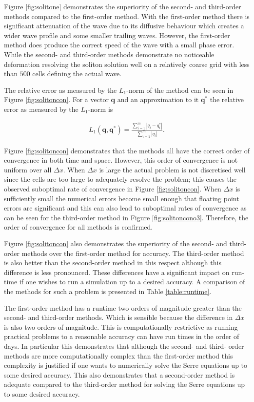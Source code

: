 \documentclass[SingleSpace,12pt,Proceedings]{Serre_ASCE}
\begin{document}
Figure \ref{fig:solitone} demonstrates the superiority of the second- and third-order methods compared to the first-order method. With the first-order method there is significant attenuation of the wave due to its diffusive behaviour which creates a wider wave profile and some smaller trailing waves. However, the first-order method does produce the correct speed of the wave with a small phase error. While the second- and third-order methods demonstrate no noticeable deformation resolving the soliton solution well on a relatively coarse grid with less than $500$ cells defining the actual wave.

The relative error as measured by the $L_1$-norm of the method can be seen in Figure \ref{fig:solitoncon}. For a vector $\boldsymbol{q}$ and an approximation to it $\boldsymbol{q}^*$ the relative error as measured by the $L_1$-norm is
\begin{linenomath*}
\begin{gather*}
L_1 \left(\boldsymbol{q},\boldsymbol{q}^*\right) = \frac{\sum_{i=1}^{m} |q_i - q^*_i|}{\sum_{i=1}^{m} |q_i|}.
\end{gather*}
\end{linenomath*}

Figure \ref{fig:solitoncon} demonstrates that the methods all have the correct order of convergence in both time and space. However, this order of convergence is not uniform over all $\Delta x$. When $\Delta x$ is large the actual problem is not discretised well since the cells are too large to adequately resolve the problem; this causes the observed suboptimal rate of convergence in Figure \ref{fig:solitoncon}. When $\Delta x$ is sufficiently small the numerical errors become small enough that floating point errors are significant and this can also lead to suboptimal rates of convergence as can be seen for the third-order method in Figure \ref{fig:solitoncono3}. Therefore, the order of convergence for all methods is confirmed.

Figure \ref{fig:solitoncon} also demonstrates the superiority of the second- and third-order methods over the first-order method for accuracy. The third-order method is also better than the second-order method in this respect although this difference is less pronounced. These differences have a significant impact on run-time if one wishes to run a simulation up to a desired accuracy. A comparison of the methods for such a problem is presented in Table \ref{table:runtime}.

The first-order method has a runtime two orders of magnitude greater than the second- and third-order methods. Which is sensible because the difference in $\Delta x$ is also two orders of magnitude. This is computationally restrictive as running practical problems to a reasonable accuracy can have run times in the order of days. In particular this demonstrates that although the second- and third- order methods are more computationally complex than the first-order method this complexity is justified if one wants to numerically solve the Serre equations up to some desired accuracy. This also demonstrates that a second-order method is adequate compared to the third-order method for solving the Serre equations up to some desired accuracy.    
\end{document}
